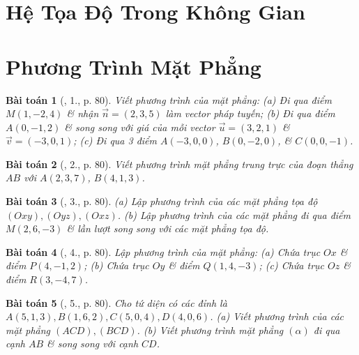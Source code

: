 \documentclass{article}
\newtheorem{baitoan}{Bài toán}
\begin{document}

\section{Hệ Tọa Độ Trong Không Gian}


\section{Phương Trình Mặt Phẳng}

\begin{baitoan}[\cite{SGK_Toan_12_hinh_hoc_co_ban}, 1., p. 80]
	Viết phương trình của mặt phẳng: (a) Đi qua điểm $M(1,-2,4)$ \& nhận $\vec{n} = (2,3,5)$ làm vector pháp tuyến; (b) Đi qua điểm $A(0,-1,2)$ \& song song với giá của mỗi vector $\vec{u} = (3,2,1)$ \& $\vec{v} = (-3,0,1)$; (c) Đi qua 3 điểm $A(-3,0,0)$, $B(0,-2,0)$, \& $C(0,0,-1)$.
\end{baitoan}

\begin{baitoan}[\cite{SGK_Toan_12_hinh_hoc_co_ban}, 2., p. 80]
	Viết phương trình mặt phẳng trung trực của đoạn thẳng $AB$ với $A(2,3,7)$, $B(4,1,3)$.
\end{baitoan}

\begin{baitoan}[\cite{SGK_Toan_12_hinh_hoc_co_ban}, 3., p. 80]
	(a) Lập phương trình của các mặt phẳng tọa độ $(Oxy),(Oyz),(Oxz)$. (b) Lập phương trình của các mặt phẳng đi qua điểm $M(2,6,-3)$ \& lần lượt song song với các mặt phẳng tọa độ.
\end{baitoan}

\begin{baitoan}[\cite{SGK_Toan_12_hinh_hoc_co_ban}, 4., p. 80]
	Lập phương trình của mặt phẳng: (a) Chứa trục $Ox$ \& điểm $P(4,-1,2)$; (b) Chứa trục $Oy$ \& điểm $Q(1,4,-3)$; (c) Chứa trục $Oz$ \& điểm $R(3,-4,7)$.
\end{baitoan}

\begin{baitoan}[\cite{SGK_Toan_12_hinh_hoc_co_ban}, 5., p. 80]
	Cho tứ diện có các đỉnh là $A(5,1,3),B(1,6,2),C(5,0,4),D(4,0,6)$. (a) Viết phương trình của các mặt phẳng $(ACD),(BCD)$. (b) Viết phương trình mặt phẳng $(\alpha)$ đi qua cạnh $AB$ \& song song với cạnh $CD$.
\end{baitoan}
\end{document}
